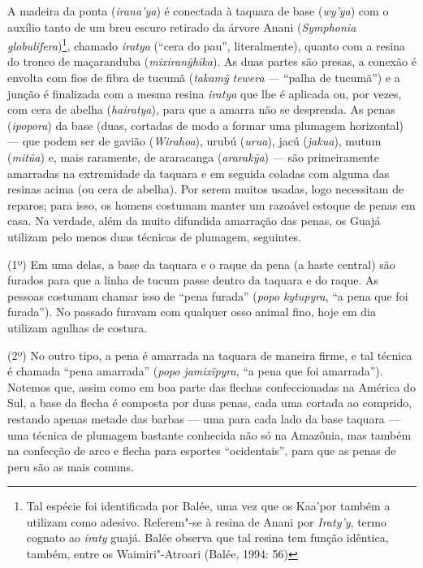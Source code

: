 A madeira da ponta (\emph{irana'ya}) é conectada à taquara de base
(\emph{wy'ya}) com o auxílio tanto de um breu escuro retirado da árvore
Anani (\emph{Symphonia globulifera})\footnote{Tal espécie foi
  identificada por Balée, uma vez que os Kaa'por também a utilizam como
  adesivo. Referem"-se à resina de Anani por \emph{Iraty'y}, termo
  cognato ao \emph{iraty} guajá. Balée observa que tal resina tem função
  idêntica, também, entre os Waimiri"-Atroari (Balée, 1994: 56)}, chamado
\emph{iratya} (``cera do pau'', literalmente), quanto com a resina do
tronco de maçaranduba (\emph{mixiranỹhika}). As duas partes são presas,
a conexão é envolta com fios de fibra de tucumã (\emph{takamỹ}
\emph{tewera} --- ``palha de tucumã'') e a junção é finalizada com a mesma
resina \emph{iratya} que lhe é aplicada ou, por vezes, com cera de
abelha (\emph{hairatya}), para que a amarra não se desprenda. As penas
(\emph{ipopora}) da base (duas, cortadas de modo a formar uma plumagem
horizontal) --- que podem ser de gavião (\emph{Wirahoa}), urubú
(\emph{urua}), jacú (\emph{jakua}), mutum (\emph{mitũa}) e, mais
raramente, de araracanga (\emph{ararakỹa}) --- são primeiramente amarradas
na extremidade da taquara e em seguida coladas com alguma das resinas
acima (ou cera de abelha). Por serem muitos usadas, logo necessitam de
reparos; para isso, os homens costumam manter um razoável estoque de
penas em casa. Na verdade, além da muito difundida amarração das penas,
os Guajá utilizam pelo menos duas técnicas de plumagem, seguintes.

(1º) Em uma delas, a base da taquara e o raque da pena (a haste central)
são furados para que a linha de tucum passe dentro da taquara e do
raque. As pessoas costumam chamar isso de ``pena furada'' (\emph{popo
kytupyra}, ``a pena que foi furada''). No passado furavam com qualquer
osso animal fino, hoje em dia utilizam agulhas de costura.

(2º) No outro tipo, a pena é amarrada na taquara de maneira firme, e tal
técnica é chamada ``pena amarrada'' (\emph{popo jamixĩpyra}, ``a pena
que foi amarrada''). Notemos que, assim como em boa parte das flechas
confeccionadas na América do Sul, a base da flecha é composta por duas
penas, cada uma cortada ao comprido, restando apenas metade das barbas ---
uma para cada lado da base taquara --- uma técnica de plumagem bastante
conhecida não só na Amazônia, mas também na confecção de arco e flecha
para esportes ``ocidentais'', para que as penas de peru são as mais
comuns.


